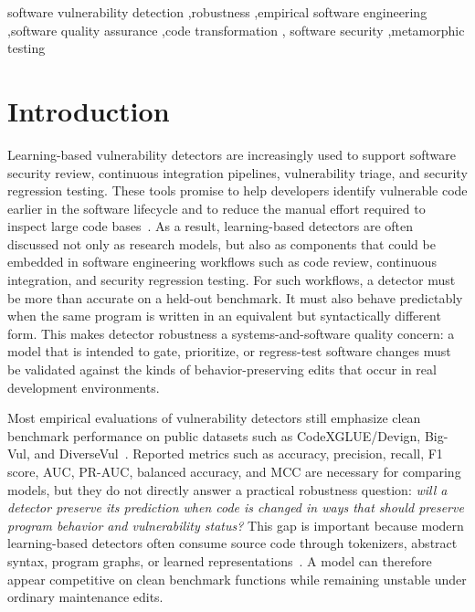 \documentclass[a4paper,fleqn]{cas-dc}
\begin{document}
\begin{keywords}
software vulnerability detection \sep robustness \sep empirical software
engineering \sep software quality assurance \sep code transformation \sep
software security \sep metamorphic testing
\end{keywords}

\maketitle

\section{Introduction}

Learning-based vulnerability detectors are increasingly used to support
software security review, continuous integration pipelines, vulnerability
triage, and security regression testing. These tools promise to help developers
identify vulnerable code earlier in the software lifecycle and to reduce the
manual effort required to inspect large code
bases~\cite{zhou2019devign,fu2022linevul,hanif2022vulberta}.
As a result, learning-based detectors are often discussed not
only as research models, but also as components that could be embedded in
software engineering workflows such as code review, continuous integration, and
security regression testing. For such workflows, a detector must be more than
accurate on a held-out benchmark. It must also behave predictably when the same
program is written in an equivalent but syntactically different form.
This makes detector robustness a systems-and-software quality concern: a model
that is intended to gate, prioritize, or regress-test software changes must be
validated against the kinds of behavior-preserving edits that occur in real
development environments.

Most empirical evaluations of vulnerability detectors still emphasize clean
benchmark performance on public datasets such as CodeXGLUE/Devign, Big-Vul,
and DiverseVul~\cite{lu2021codexglue,zhou2019devign,fan2020bigvul,chen2023diversevul}.
Reported metrics such as accuracy, precision, recall, F1 score, AUC, PR-AUC,
balanced accuracy, and MCC are necessary for comparing models, but they do not
directly answer a practical robustness question: \textit{will a detector
preserve its prediction when code is changed in ways that should preserve
program behavior and vulnerability status?} This gap is important because modern learning-based
detectors often consume source code through tokenizers, abstract syntax,
program graphs, or learned representations~\cite{feng2020codebert,fu2022linevul,nguyen2022regvd}.
A model can therefore appear competitive on clean benchmark functions while
remaining unstable under ordinary maintenance edits.
\end{document}
